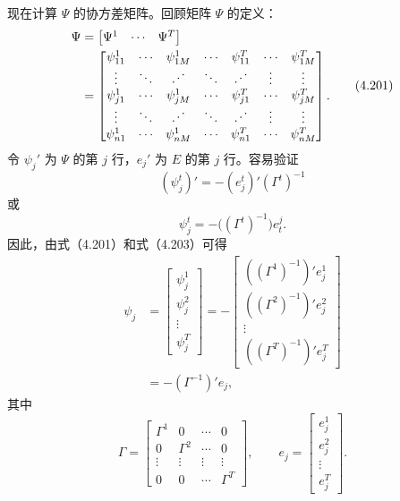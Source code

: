 现在计算 $\Psi$ 的协方差矩阵。回顾矩阵 $\Psi$ 的定义：
\begin{equation}
\begin{aligned}
\Psi&=\begin{bmatrix}\Psi^1&\cdots&\Psi^T\end{bmatrix}\\
&=\begin{bmatrix}
\psi_{11}^1&\cdots&\psi_{1M}^1&\cdots&\psi_{11}^T&\cdots&\psi_{1M}^T\\
\vdots&\ddots&\chFourBIddots&\ddots&\chFourBIddots&\vdots&\vdots\\
\psi_{j1}^1&\cdots&\psi_{jM}^1&\cdots&\psi_{j1}^T&\cdots&\psi_{jM}^T\\
\vdots&\ddots&\chFourBIddots&\ddots&\chFourBIddots&\vdots&\vdots\\
\psi_{n1}^1&\cdots&\psi_{nM}^1&\cdots&\psi_{n1}^T&\cdots&\psi_{nM}^T
\end{bmatrix}.
\end{aligned}\tag{4.201}
\end{equation}
令 $\psi_j'$ 为 $\Psi$ 的第 $j$ 行，$e_j'$ 为 $E$ 的第 $j$ 行。容易验证
\begin{equation}
(\psi_j^t)'=-(e_j^t)'(\Gamma^t)^{-1}\tag{4.202}
\end{equation}
或
\begin{equation}
\psi_j^t=-\bigl((\Gamma^t)^{-1}\bigr)e_t^j.\tag{4.203}
\end{equation}
因此，由式（4.201）和式（4.203）可得
\begin{equation}
\begin{aligned}
\psi_j
&=\begin{bmatrix}\psi_j^1\\\psi_j^2\\\vdots\\\psi_j^T\end{bmatrix}
=-\begin{bmatrix}
((\Gamma^1)^{-1})'e_j^1\\
((\Gamma^2)^{-1})'e_j^2\\\vdots\\
((\Gamma^T)^{-1})'e_j^T
\end{bmatrix}\\
&=-(\Gamma^{-1})'e_j,
\end{aligned}\tag{4.204}
\end{equation}
其中
\[
\Gamma=\begin{bmatrix}
\Gamma^1&0&\cdots&0\\0&\Gamma^2&\cdots&0\\
\vdots&\vdots&\vdots&\vdots\\0&0&\cdots&\Gamma^T
\end{bmatrix},\qquad
e_j=\begin{bmatrix}e_j^1\\e_j^2\\\vdots\\e_j^T\end{bmatrix}.
\]
